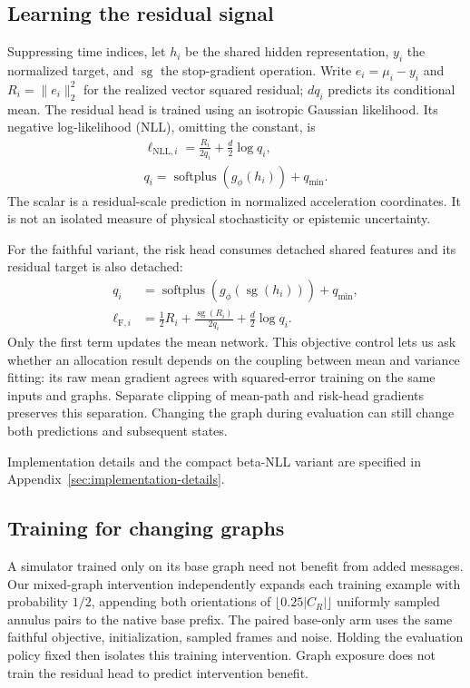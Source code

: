 \subsection{Learning the residual signal}
Suppressing time indices, let $h_i$ be the shared hidden representation, $y_i$ the normalized target, and $\operatorname{sg}$ the stop-gradient operation. Write $e_i=\mu_i-y_i$ and $R_i=\|e_i\|_2^2$ for the realized vector squared residual; $dq_i$ predicts its conditional mean. The residual head is trained using an isotropic Gaussian likelihood. Its negative log-likelihood (NLL), omitting the constant, is
\begin{align}
 \ell_{\mathrm{NLL},i}=\frac{R_i}{2q_i}+\frac d2\log q_i,\nonumber\\
 q_i=\operatorname{softplus}(g_\phi(h_i))+q_{\min}.
 \label{eq:nll}
\end{align}
The scalar is a residual-scale prediction in normalized acceleration coordinates. It is not an isolated measure of physical stochasticity or epistemic uncertainty.

For the faithful variant, the risk head consumes detached shared features and its residual target is also detached:
\begin{align}
 q_i&=\operatorname{softplus}(g_\phi(\operatorname{sg}(h_i)))+q_{\min},\nonumber\\
 \ell_{\mathrm F,i}&=\tfrac12R_i+
 \frac{\operatorname{sg}(R_i)}{2q_i}+\frac d2\log q_i.
 \label{eq:faithful}
\end{align}
Only the first term updates the mean network. This objective control lets us ask whether an allocation result depends on the coupling between mean and variance fitting: its raw mean gradient agrees with squared-error training on the same inputs and graphs. Separate clipping of mean-path and risk-head gradients preserves this separation. Changing the graph during evaluation can still change both predictions and subsequent states.

Implementation details and the compact beta-NLL variant are specified in Appendix~\ref{sec:implementation-details}.

\subsection{Training for changing graphs}
A simulator trained only on its base graph need not benefit from added messages. Our mixed-graph intervention independently expands each training example with probability $1/2$, appending both orientations of $\lfloor0.25|C_R|\rfloor$ uniformly sampled annulus pairs to the native base prefix. The paired base-only arm uses the same faithful objective, initialization, sampled frames and noise. Holding the evaluation policy fixed then isolates this training intervention. Graph exposure does not train the residual head to predict intervention benefit.

